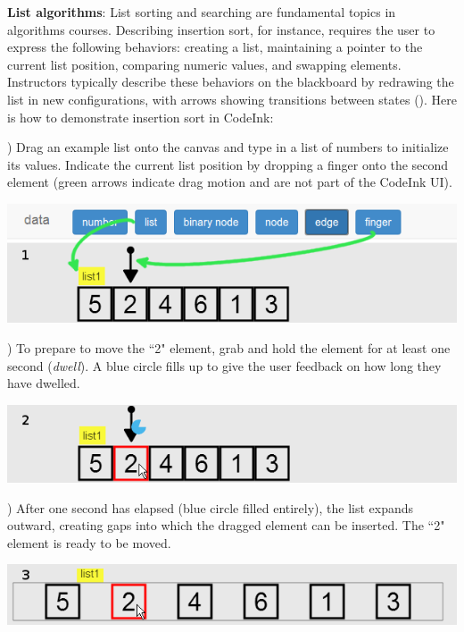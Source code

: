\noindent \textbf{List algorithms}:
List sorting and searching are fundamental topics in algorithms courses. Describing insertion
sort, for instance, requires the user to express the following behaviors:
creating a list, maintaining a pointer to the current list position, comparing
numeric values, and swapping elements. Instructors typically describe these
behaviors on the blackboard by redrawing the list in new configurations, with
arrows showing transitions between states ().
Here is how to demonstrate insertion sort in CodeInk:

) Drag an example list onto the canvas and type in a list of numbers
to initialize its values. Indicate the current list position by dropping a
finger onto the second element (green arrows indicate drag motion and
are not part of the CodeInk UI).

\vspace{-0.25em}
\noindent \includegraphics[width=0.7\columnwidth]{img/examples/insertion-1.png}
\vspace{0.5em}

) To prepare to move the ``2" element, grab and hold the element for
at least one second (\emph{dwell}). A blue circle fills up to give the user
feedback on how long they have dwelled.

\vspace{-0.25em}
\noindent \includegraphics[width=0.7\columnwidth]{img/examples/insertion-2.png}
\vspace{0.4em}

) After one second has elapsed (blue circle filled entirely), the
list expands outward, creating gaps into which the dragged element can be
inserted. The ``2" element is ready to be moved.

\vspace{-0.25em}
\noindent \includegraphics[width=0.7\columnwidth]{img/examples/insertion-3.png}
\vspace{0.5em}

